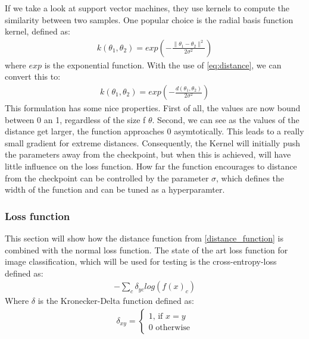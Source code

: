 If we take a look at support vector machines, they use kernels to compute the
similarity between two samples. One popular choice is the radial basis function
kernel, defined as:
\begin{align}
    k(\theta_1, \theta_2)=exp(-\frac{\rVert \theta_1 - \theta_2 \lVert^2}{2\sigma^2})
\end{align}
where $exp$ is the exponential function.
With the use of \ref{eq:distance}, we can convert this to:
\begin{align}
    k(\theta_1, \theta_2)=exp(-\frac{d(\theta_1, \theta_2)}{2\sigma^2})
\end{align}
This formulation has some nice properties. First of all, the values are now
bound between 0 an 1, regardless of the size f $\theta$. Second, we can see as
the values of the distance get larger, the function approaches 0 asymtotically.
This leads to a really small gradient for extreme distances. Consequently, the
Kernel will initially push the parameters away from the checkpoint, but when
this is achieved, will have little influence on the loss function. How far the
function encourages to distance from the checkpoint can be controlled by the
parameter $\sigma$, which defines the width of the function and can be tuned as
a hyperparamter.


\subsubsection{Loss function}
This section will show how the distance function from \ref{distance_function} is
combined with the normal loss function. The state of the art loss function for
image classification, which will be used for testing is the cross-entropy-loss
defined as:
\begin{align}
    -\sum_{c} \delta_{yc} log(f(x)_c)
\end{align}
Where $\delta$ is the Kronecker-Delta function defined as:
\begin{align}
    \delta_{xy} =
    \begin{cases}
        1 \textrm{, if } x=y \\
        0 \textrm{ otherwise}
    \end{cases}
\end{align}


